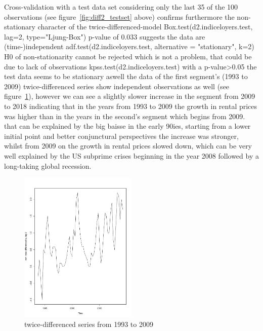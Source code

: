 \documentclass[11pt,a4paper]{article}
\begin{document}
Cross-validation with a test data set considering only the last 35 of the 100 observations (see figure~\ref{fig:diff2_testset} above) confirms furthermore the non-stationary character of the twice-differenced-model 
Box.test(d2.indiceloyers.test, lag=2, type="Ljung-Box") p-value of 0.033 suggests the data are (time-)independent
adf.test(d2.indiceloyers.test, alternative = "stationary", k=2)  H0 of non-stationarity cannot be rejected which is not a problem, that could be due to lack of observations
kpss.test(d2.indiceloyers.test)  with a p-value>0.05 the test data seems to be stationary aswell
the data of the first segment's (1993 to 2009) twice-differenced series show independent observations as well (see figure~\ref{fig:diff2_trainingset}), however we can see a slightly slower increase in the segment from 2009 to 2018 indicating that in the years from 1993 to 2009 the growth in rental prices was higher than in the years in the second's segment which begins from 2009. that can be explained by the big baisse in the early 90ies, starting from a lower initial point and better conjunctural perspectives the increase was stronger, whilst from 2009 on the growth in rental prices slowed down, which can be very well explained by the US subprime crises beginning in the year 2008 followed by a long-taking global recession.
\begin{figure}
\centering
\includegraphics[angle=0,
width=0.5\textwidth]{diff2_trainingset}
\caption{twice-differenced series from 1993 to 2009
\label{fig:diff2_trainingset}}
\end{figure}
\end{document}
